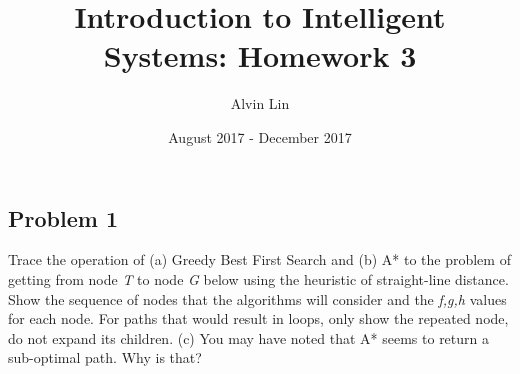 \documentclass{math}
\title{Introduction to Intelligent Systems: Homework 3}
\author{Alvin Lin}
\date{August 2017 - December 2017}
\begin{document}
\maketitle

\subsection*{Problem 1}
Trace the operation of (a) Greedy Best First Search and (b) A* to the problem of
getting from node \textit{T} to node \textit{G} below using the heuristic of
straight-line distance. Show the sequence of nodes that the algorithms will
consider and the \textit{f,g,h} values for each node. For paths that would
result in loops, only show the repeated node, do not expand its children. (c)
You may have noted that A* seems to return a sub-optimal path. Why is that?
\end{document}
